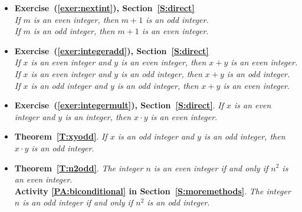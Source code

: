 %
\begin{itemize}
\item \textbf{Exercise~(\ref{exer:nextint}), Section~\ref{S:direct}} \\
\emph{
If $m$ is an even integer, then $m+1$ is an odd integer. \\ 
If $m$ is an odd integer, then $m+1$ is an even integer}.

\item \textbf{Exercise~(\ref{exer:integeradd}), Section~\ref{S:direct}} \\
\emph{
If $x$ is an even integer and $y$ is an even integer, then $x+y$ is an even integer.  \\
If $x$ is an even integer and $y$ is an odd integer, then $x+y$ is an odd integer. \\
If $x$ is an odd integer and $y$ is an odd integer, then $x+y$ is an even integer}.

\item \textbf{Exercise~(\ref{exer:integermult}),  Section~\ref{S:direct}}.  \emph{If $x$ is an even integer and $y$ is an integer, then $ x \cdot y $ is an even integer}.

\item \textbf{Theorem~\ref{T:xyodd}}.  \emph{If $x$ is an odd integer and $y$ is an odd integer, then $ x \cdot y $ is an odd integer}.

\item \textbf{Theorem~\ref{T:n2odd}}. \emph{The integer $n$ is an even integer if and only if $n^2$ is an even integer}.  \\
\textbf{\typeu Activity \ref*{PA:biconditional} in Section~\ref{S:moremethods}}. \emph{The integer $n$ is an odd integer if and only if $n^2$ is an odd integer}.
\end{itemize}
\hbreak


